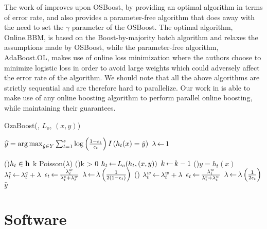 The work of \citet{Beygelzimer2015optimal} improves upon OSBoost,
by providing an optimal algorithm in terms of error rate, and also provides
a parameter-free algorithm that does away with the need to set the $\gamma$
parameter of the OSBoost.
The optimal algorithm, Online.BBM, is based on the Boost-by-majority batch
algorithm \cite{batch-bbm} and relaxes the assumptions made by OSBoost,
while the parameter-free algorithm, AdaBoost.OL, makes use of online
loss minimization where the authors choose to minimize logistic loss
in order to avoid large weights which could adversely affect the
error rate of the algorithm.
We should note that all the above algorithms are strictly sequential
and are therefore hard to parallelize.
Our work in \boostvht is able to
make use of any online boosting algorithm to perform
parallel online boosting, while maintaining their guarantees.


\begin{algorithm}
	\small
	\caption{OzaBoost(\ensemble, $L_o$, $(x,y)$)}
	\label{alg:ozaboost}
	 \;
	$\widehat{y} = \operatorname*{arg\,max}_{\dot{y} \in Y} \sum_{t = 1}^{s} \log \left( \frac{1-\epsilon_t}{\epsilon_t} \right) I\left( h_t(x) = \dot{y} \right)$ \;
	 \;
	$\lambda {\,\leftarrow\,} 1$\;

	\ForEach(){$h_t \in \mathbf{h}$}{
		k  Poisson($\lambda$) \;
		\While(){k > 0}{
			$h_t {\,\leftarrow\,} L_o(h_t, (x,y))$ \;
			$k {\,\leftarrow\,} k-1$ \;
		}
		\If(){$y = h_t(x)$}{
			$\lambda^c_t {\,\leftarrow\,} \lambda^c_t + \lambda$ \;
			$\epsilon_t {\,\leftarrow\,} \frac{\lambda^w_t}{\lambda^c_t + \lambda^w_t}$ \;
			$\lambda {\,\leftarrow\,} \lambda \left( \frac{1}{2(1 - \epsilon_t)} \right)$ \;
		}\Else(){
			$\lambda^w_t {\,\leftarrow\,} \lambda^w_t + \lambda$ \;
			$\epsilon_t {\,\leftarrow\,} \frac{\lambda^w_t}{\lambda^c_t + \lambda^w_t}$ \;
			$\lambda {\,\leftarrow\,} \lambda \left( \frac{1}{2 \epsilon_t} \right)$ \;
		}
	}
	\Return $\widehat{y}$ \;
\end{algorithm}

\section{Software}
\label{sec:bg-ol-software}

